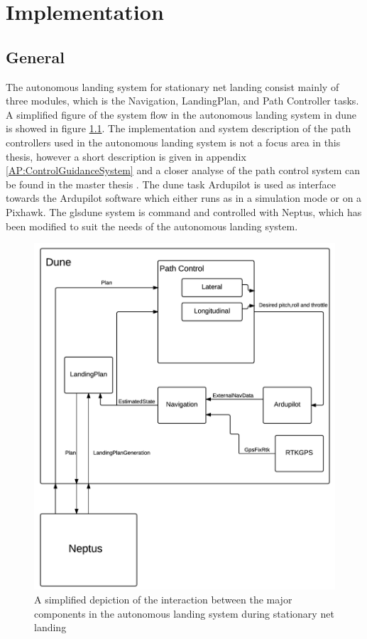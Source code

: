 \chapter{Implementation}\label{Ch:Implementation}
\section{General}
The autonomous landing system for stationary net landing consist mainly of three modules, which is the Navigation, LandingPlan, and Path Controller tasks. A simplified figure of the system flow in the autonomous landing system in \gls{dune} is showed in figure \ref{fig:DuneSystem}. The implementation and system description of the path controllers used in the autonomous landing system is not a focus area in this thesis, however a short description is given in appendix \ref{AP:ControlGuidanceSystem} and a closer analyse of the path control system can be found in the master thesis \citep{Sigurd}. The \gls{dune} task Ardupilot is used as interface towards the Ardupilot software which either runs as in a simulation mode or on a Pixhawk. The gls{dune} system is command  and controlled with Neptus, which has been modified to suit the needs of the autonomous landing system.
\begin{figure}[H]
	\centering
		\includegraphics[scale=0.8]{figs/DUNESystem.png}
		\caption{A simplified depiction of the interaction between the major components in the autonomous landing system during stationary net landing}
		\label{fig:DuneSystem}
\end{figure}
